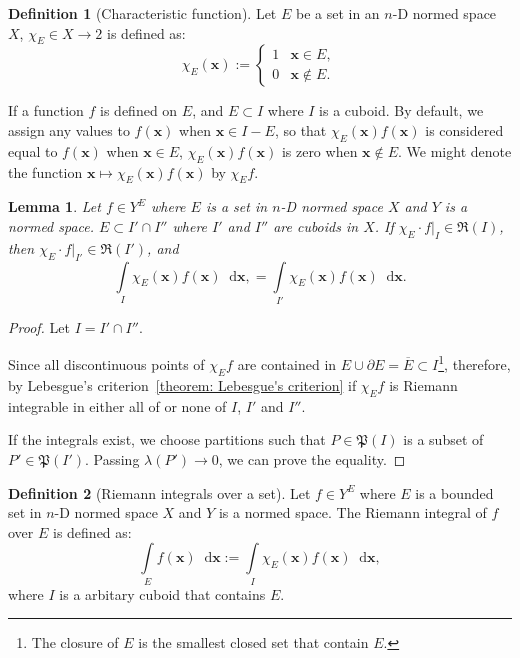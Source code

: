 \documentclass[openany]{book}
\theoremstyle{plain}
\newtheorem{lemma}{Lemma} %
\theoremstyle{definition}
\newtheorem{definition}{Definition}[section] %
\newcommand{\dif}{\mathop{}\!\mathrm{d}} %
\newcommand*{\bv}{\boldsymbol} %
\begin{document}
\begin{definition}[Characteristic function]
	Let $E$ be a set in an $n$-D normed space $X$, $\chi_E \in X \to 2$ is defined as:
	\begin{equation*}
		\chi_E(\bv x) := \begin{cases}
			1 & \bv x \in E,
			\\
			0 & \bv x \notin E.
		\end{cases}
	\end{equation*}
\end{definition}

If a function $f$ is defined on $E$, and $E \subset I$ where $I$ is a cuboid. 
By default, we assign any values to $f(\bv x)$ when $\bv x \in I - E$, so that $\chi_E(\bv x) f(\bv x)$ is considered equal to $f(\bv x)$ when $\bv x \in E$, $\chi_E(\bv x) f(\bv x)$ is zero when $\bv x \notin E$. 
We might denote the function $\bv x \mapsto \chi_E(\bv x) f(\bv x)$ by $\chi_E f$.

\begin{lemma}
	Let $f \in Y^E$ where $E$ is a set in $n$-D normed space $X$ and $Y$ is a normed space.
	$E \subset I' \cap I''$ where $I'$ and $I''$ are cuboids in $X$. 
	If $\chi_E \cdot f|_I \in \mathfrak R(I)$, then $\chi_E \cdot f|_{I'} \in \mathfrak R(I')$, and
	\begin{equation*}
		\int\limits_{I} \chi_E(\bv x) f(\bv x) \dif \bv x,
			= \int\limits_{I'} \chi_E(\bv x) f(\bv x) \dif \bv x.
	\end{equation*} 
\end{lemma}
\begin{proof}
	Let $I = I' \cap I''$. 

	Since all discontinuous points of $\chi_E f$ are contained in $E \cup \partial E = \overline{E}\subset I$\footnote{The closure of $E$ is the smallest closed set that contain $E$.}, therefore, by Lebesgue's criterion~\ref{theorem: Lebesgue's criterion} if $\chi_E f$ is Riemann integrable in either all of or none of $I$, $I'$ and $I''$.

	If the integrals exist, we choose partitions such that $P \in \mathfrak P(I)$ is a subset of $P' \in \mathfrak P(I')$. Passing $\lambda(P') \to 0$, we can prove the equality.
\end{proof}

\begin{definition}[Riemann integrals over a set]
	Let $f \in Y^E$ where $E$ is a bounded set in $n$-D normed space $X$ and $Y$ is a normed space.
	The Riemann integral of $f$ over $E$ is defined as:
	\begin{equation*}
		\int\limits_E f(\bv x) \dif \bv x := \int\limits_I \chi_E(\bv x) f(\bv x) \dif \bv x,
	\end{equation*}
	where $I$ is a arbitary cuboid that contains $E$.
\end{definition}
\end{document}

